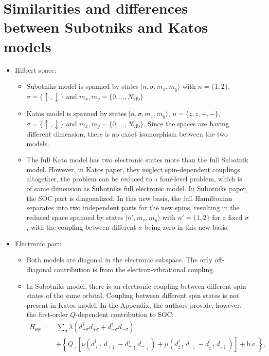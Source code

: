 \documentclass{article}
\newcommand{\pdagger}{{\phantom{\dagger}}}
\newcommand{\state}[1]{\vert #1\rangle}
\begin{document}
\section{Similarities and differences between Subotniks and Katos models}
\begin{itemize}
	\item Hilbert space:
	\begin{itemize}
		\item Subotniks model is spanned by states $\vert n,\sigma, m_x,m_y\rangle$ with $n=\{1,2\}$, $\sigma=\{\uparrow,\downarrow\}$ and $m_x,m_y = \{0,...,N_\mathrm{vib}\}$
		\item Katos model is spanned by states $\vert n,\sigma, m_x,m_y\rangle$, $n=\{z,\bar{z},+,-\}$, $\sigma=\{\uparrow,\downarrow\}$ and $m_x,m_y = \{0,...,N_\mathrm{vib}\}$. Since the spaces are having different dimension, there is no exact isomorphism between the two models.  
		\item The full Kato model has two electronic states more than the full Subotnik model. However, in Katos paper, they neglect spin-dependent couplings altogether, the problem can be reduced to a four-level problem, which is of same dimension as Subotniks full electronic model. In Subotniks paper, the SOC part is diagonalized. In this new basis, the full Hamiltonian separates into two independent parts for the new spins, resulting in the reduced space spanned by states $\state{n',m_x,m_y}$ with $n'=\{1,2\}$ for a fixed $\sigma$, with the coupling between different $\sigma$ being zero in this new basis.   
	\end{itemize}
	\item Electronic part:
	\begin{itemize}
		\item Both models are diagonal in the electronic subspace. The only off-diagonal contribution is from the electron-vibrational coupling. 
		\item In Subotniks model, there is an electronic coupling between different spin states of the same orbital. Coupling between different spin states is not present in Katos model. In the Appendix, the authors provide, however, the first-order $Q$-dependent contribution to SOC:
		\begin{align*}
			H_\mathrm{soc}=&\sum_\sigma \lambda(d_{+\sigma}^\dagger d_{+\sigma}^\pdagger + d_{-\sigma}^\dagger d_{-\sigma}^\pdagger)\\
			& +\left\{Q_+ \left[\nu (d_{+\uparrow}^\dagger d_{+\downarrow}^\pdagger - d_{-\uparrow}^\dagger d_{-\downarrow}^\pdagger) + \mu (d_{z\uparrow}^\dagger d_{z \downarrow}^\pdagger - d_{\overline{z}\uparrow}^\dagger d_{\overline{z}\downarrow}^\pdagger)\right] + \mathrm{h.c.}\right\},

\end{align*}
\end{itemize}
\end{itemize}
\end{document}
